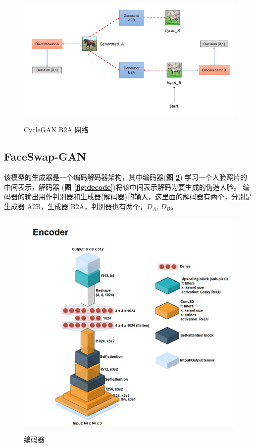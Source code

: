 \begin{figure}[h!]
	\caption{CycleGAN B2A 网络}
	\centering
	\includegraphics[width=\textwidth]{figure/resources/cycleB2A.png}
	\label{fig:cycleB2A}
\end{figure}

\subsection{FaceSwap-GAN}
该模型的生成器是一个编码解码器架构，其中编码器(\textbf{图 \ref{fig:encode}}) 学习一个人脸照片的中间表示，解码器 (\textbf{图 \ref{fig:decode}})将该中间表示解码为要生成的伪造人脸。
编码器的输出用作判别器和生成器(解码器)的输入，这里面的解码器有两个，分别是生成器 A2B，生成器 B2A，判别器也有两个，$D_A$, $D_B$。

\begin{figure}[h!]
	\caption{编码器}
	\centering
	\includegraphics[width=\textwidth]{figure/resources/encode.jpg}
	\label{fig:encode}
\end{figure}

